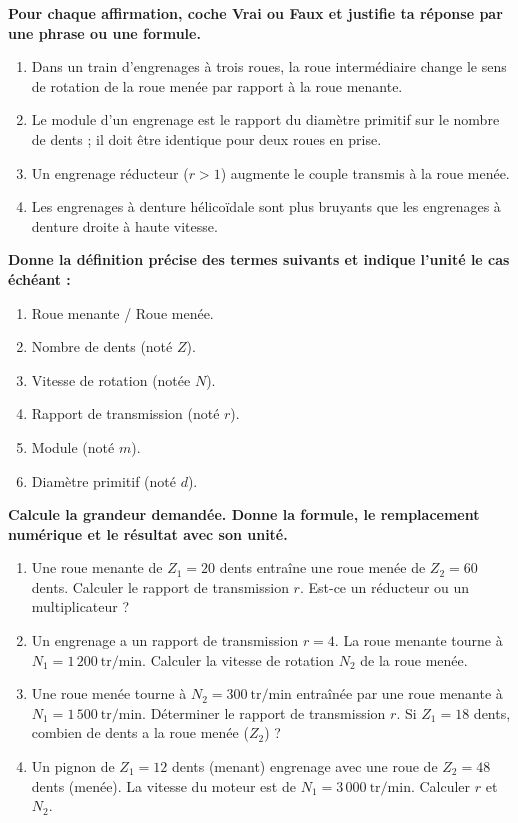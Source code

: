 \documentclass[11pt]{article}
\begin{document}
\begin{exercice}
\textbf{Pour chaque affirmation, coche Vrai ou Faux et justifie ta réponse par une phrase ou une formule.}
\begin{enumerate}
    \item Dans un train d'engrenages à trois roues, la roue intermédiaire change le sens de rotation de la roue menée par rapport à la roue menante.
    \item Le module d'un engrenage est le rapport du diamètre primitif sur le nombre de dents ; il doit être identique pour deux roues en prise.
    \item Un engrenage réducteur ($r > 1$) augmente le couple transmis à la roue menée.
    \item Les engrenages à denture hélicoïdale sont plus bruyants que les engrenages à denture droite à haute vitesse.
\end{enumerate}
\end{exercice}

\begin{exercice}
\textbf{Donne la définition précise des termes suivants et indique l'unité le cas échéant :}
\begin{enumerate}
    \item Roue menante / Roue menée.
    \item Nombre de dents (noté $Z$).
    \item Vitesse de rotation (notée $N$).
    \item Rapport de transmission (noté $r$).
    \item Module (noté $m$).
    \item Diamètre primitif (noté $d$).
\end{enumerate}
\end{exercice}

\begin{exercice}
\textbf{Calcule la grandeur demandée. Donne la formule, le remplacement numérique et le résultat avec son unité.}
\begin{enumerate}
    \item Une roue menante de $Z_1 = 20$ dents entraîne une roue menée de $Z_2 = 60$ dents. Calculer le rapport de transmission $r$. Est-ce un réducteur ou un multiplicateur ?
    \item Un engrenage a un rapport de transmission $r = 4$. La roue menante tourne à $N_1 = 1\,200\ \text{tr/min}$. Calculer la vitesse de rotation $N_2$ de la roue menée.
    \item Une roue menée tourne à $N_2 = 300\ \text{tr/min}$ entraînée par une roue menante à $N_1 = 1\,500\ \text{tr/min}$. Déterminer le rapport de transmission $r$. Si $Z_1 = 18$ dents, combien de dents a la roue menée ($Z_2$) ?
    \item Un pignon de $Z_1 = 12$ dents (menant) engrenage avec une roue de $Z_2 = 48$ dents (menée). La vitesse du moteur est de $N_1 = 3\,000\ \text{tr/min}$. Calculer $r$ et $N_2$.
\end{enumerate}
\end{exercice}
\end{document}
